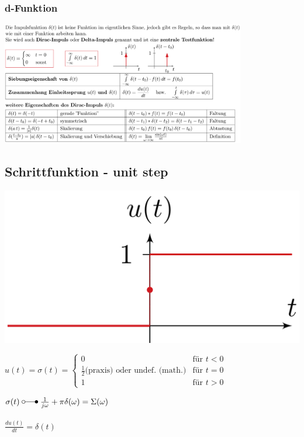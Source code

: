 	\subsubsection{d-Funktion}
		\includegraphics[width=0.8\textwidth]{./bilder/funktionen/impulsF.png}


	\subsection{Schrittfunktion - unit step}
		\begin{minipage}{0.2\textwidth}
			\includegraphics[width=\textwidth]{./bilder/funktionen/sprungF.png}
		\end{minipage}
		\qquad
		\begin{minipage}{0.45\textwidth}
			$u(t) = \sigma(t) =	\begin{cases}
			0 & \text{f\"ur } t < 0 \\
			\frac{1}{2} \text{(praxis)}  \text{ oder undef. (math.)} & \text{f\"ur } t = 0 \\
			1 & \text{f\"ur } t > 0
			\end{cases}$
		\end{minipage}
		\qquad
		\begin{minipage}{0.25\textwidth}						
			$\sigma(t) \; \laplace \; \frac{1}{j\omega} + \pi\delta(\omega) = \Sigma(\omega)$ \\
			\\
			$\frac{du(t)}{dt}=\delta(t)$\\
		\end{minipage}
	
